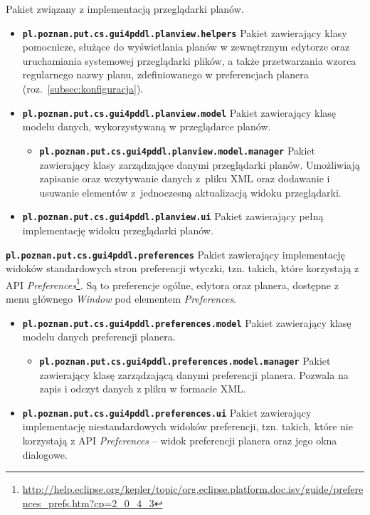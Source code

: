 \begin{description}
\item [\texttt{pl.poznan.put.cs.gui4pddl.planview}] Pakiet związany z implementacją przeglądarki planów.
\begin{itemize}
\item \texttt{\textbf{pl.poznan.put.cs.gui4pddl.planview.helpers}} Pakiet zawierający klasy pomocnicze, służące do wyświetlania planów w zewnętrznym edytorze oraz uruchamiania systemowej przeglądarki plików, a także przetwarzania wzorca regularnego nazwy planu, zdefiniowanego w preferencjach planera (roz.~\ref{subsec:konfiguracja}).
\item \texttt{\textbf{pl.poznan.put.cs.gui4pddl.planview.model}} Pakiet zawierający klasę modelu danych, wykorzystywaną w przeglądarce planów.
\begin{itemize}
\item \texttt{\textbf{pl.poznan.put.cs.gui4pddl.planview.model.manager}} Pakiet zawierający klasy zarządzające danymi przeglądarki planów. Umożliwiają zapisanie oraz wczytywanie danych z~pliku XML oraz dodawanie i usuwanie elementów z~jednoczesną aktualizacją widoku przeglądarki.
\end{itemize}
\item \texttt{\textbf{pl.poznan.put.cs.gui4pddl.planview.ui}} Pakiet zawierający pełną implementację widoku przeglądarki planów.
\end{itemize}
\item \texttt{\textbf{pl.poznan.put.cs.gui4pddl.preferences}} Pakiet zawierający implementację widoków standardowych stron preferencji wtyczki, tzn. takich, które korzystają z API \emph{Preferences}\footnote{\url{http://help.eclipse.org/kepler/topic/org.eclipse.platform.doc.isv/guide/preferences_prefs.htm?cp=2_0_4_3}}. Są to preferencje ogólne, edytora oraz planera, dostępne z menu głównego \textit{Window} pod elementem \textit{Preferences}.
\begin{itemize}
\item \texttt{\textbf{pl.poznan.put.cs.gui4pddl.preferences.model}} Pakiet zawierający klasę modelu danych preferencji planera.
\begin{itemize}
\item \texttt{\textbf{pl.poznan.put.cs.gui4pddl.preferences.model.manager}} Pakiet zawierający klasę zarządzającą danymi preferencji planera. Pozwala na zapis i odczyt danych z pliku w formacie XML.
\end{itemize}
\item \texttt{\textbf{pl.poznan.put.cs.gui4pddl.preferences.ui}} Pakiet zawierający implementację niestandardowych widoków preferencji, tzn. takich, które nie korzystają z API \emph{Preferences} -- widok preferencji planera oraz jego okna dialogowe.

\end{itemize}
\end{description}
